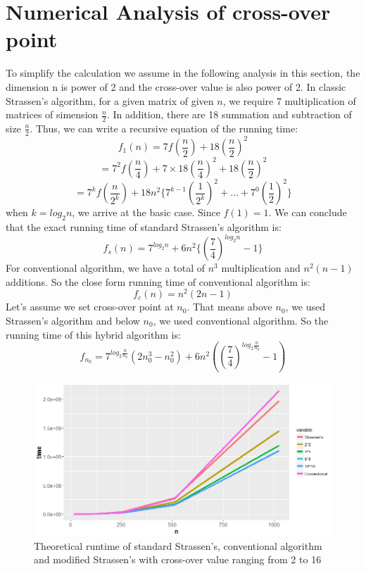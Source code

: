 \documentclass[a4paper, 11pt]{article}
\begin{document}
\section*{Numerical Analysis of cross-over point}
To simplify the calculation we assume in the following analysis in this section, the dimension n is power of 2 and the cross-over value is also power of 2. In classic Strassen's algorithm, for a given matrix of given $n$, we require 7 multiplication of matrices of simension $\frac{n}{2}$. In addition, there are 18 summation and subtraction of size $\frac{n}{2}$. Thus, we can write a recursive equation of the running time:
\[{f_1}(n)=7f(\frac{n}{2})+18(\frac{n}{2})^2\] 
\[=7^2f(\frac{n}{4})+7\times18 (\frac{n}{4})^2+18(\frac{n}{2})^2\] 
\[=7^kf(\frac{n}{2^k})+18n^2\{7^{k-1}(\frac{1}{2^k})^2+\dots+7^0(\frac{1}{2})^2\}\]
when $k=log_2{n}$, we arrive at the basic case. Since $f(1)=1$. We can conclude that the exact running time of standard Strassen's algorithm is:
\[f_s(n)=7^{log_2{n}}+6n^2\{(\frac{7}{4})^{log_2{n}}-1\}\]
For conventional algorithm, we have a total of $n^3$ multiplication and $n^2(n-1)$ additions. So the close form running time of conventional algorithm is:
\[f_c(n)=n^2(2n-1)\]
Let's assume we set cross-over point at $n_0$. That means above $n_0$, we used Strassen's algorithm and below $n_0$, we used conventional algorithm. So the running time of this hybrid algorithm is:
\[f_{n_0}=7^{log_2{\frac{n}{n_0}}}(2n_0^3-n_0^2)+6n^2((\frac{7}{4})^{log_2{\frac{n}{n_0}}}-1)\]
\begin{figure}
	\centering
	\includegraphics[width=0.9\linewidth]{TRuntimemulti}
	\caption{Theoretical runtime of standard Strassen's, conventional algorithm and modified Strassen's with cross-over value ranging from 2 to 16 }
	\label{fig:truntimemulti}
\end{figure}
\end{document}
